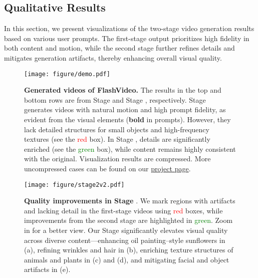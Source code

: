 \subsection{Qualitative Results}
In this section, we present visualizations of the two-stage video generation results based on various user prompts. The first-stage output prioritizes high fidelity in both content and motion, while the second stage further refines details and mitigates generation artifacts, thereby enhancing overall visual quality.


\begin{figure}[!t]
\begin{center}
\texttt{[image: figure/demo.pdf]}
\end{center}
\caption{\textbf{Generated videos of FlashVideo.} The results in the top and bottom rows are from Stage  and Stage , respectively. Stage  generates videos with natural motion and high prompt fidelity, as evident from the visual elements (\textbf{bold} in prompts). However, they lack detailed structures for small objects and high-frequency textures (see the \textcolor{red}{red} box). In Stage , details are significantly enriched (see the \textcolor{green}{green} box), while content remains highly consistent with the original. Visualization results are compressed. More uncompressed cases can be found on our \href{https://jshilong.github.io/flashvideo-page/}{project page}.}\label{fig:demo}
\end{figure}

\begin{figure}[!t]
\begin{center}
\texttt{[image: figure/stage2v2.pdf]}
\end{center}
\caption{\textbf{Quality improvements in Stage  }. We mark regions with artifacts and lacking detail in the first-stage videos using \textcolor{red}{red} boxes, while improvements from the second stage are highlighted in \textcolor{green}{green}. Zoom in for a better view. Our Stage  significantly elevates visual quality across diverse content—enhancing oil painting–style sunflowers in (a), refining wrinkles and hair in (b), enriching texture structures of animals and plants in (c) and (d), and mitigating facial and object artifacts in (e).
}
\label{fig:stage2}
\end{figure}


